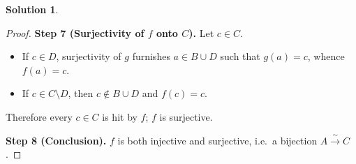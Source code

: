 \documentclass[12pt]{article}
\theoremstyle{definition} %
\newtheorem{solution}{Solution}
\theoremstyle{plain} %
\begin{document}
\begin{solution}
\begin{proof}
      \bigskip
      \textbf{Step 7 (Surjectivity of $f$ onto $C$).}
      Let $c\in C$.
      
      \begin{itemize}
        \item If $c\in D$, surjectivity of $g$ furnishes $a\in B\cup D$
              such that $g(a)=c$, whence $f(a)=c$.
        \item If $c\in C\setminus D$, then $c\notin B\cup D$
              and $f(c)=c$.
      \end{itemize}
      Therefore every $c\in C$ is hit by $f$; $f$ is surjective.
      
      \bigskip
      \textbf{Step 8 (Conclusion).}
      $f$ is both injective and surjective, i.e.\ a bijection
      $A\xrightarrow{\;\sim\;} C$.
      \end{proof}    
  \end{solution}
\end{document}
